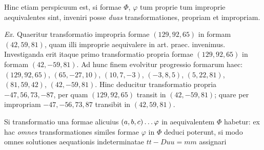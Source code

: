 Hinc etiam perspicuum est, si formae $\Phi$, $\varphi$ tum proprie tum improprie aequivalentes sint, inveniri posse \textit{duas} transformationes, propriam et impropriam.

\textit{Ex.} Quaeritur transformatio impropria formae $(129,92,65)$ in formam $(42,59,81)$, quam illi improprie aequivalere in art. praec. invenimus. Investiganda erit itaque primo transformatio propria formae $(129,92,65)$ in formam $(42,-59,81)$. Ad hunc finem evolvitur progressio formarum haec: $(129,92,65)$, $(65,-27,10)$, $(10,7,-3)$, $(-3,8,5)$, $(5,22,81)$, $(81,59,42)$, $(42,-59,81)$. Hinc deducitur transformatio propria $-47,56,73,-87$, per quam $(129,92,65)$ transit in $(42,-59,81)$; quare per impropriam $-47,\allowbreak-56,\allowbreak73,\allowbreak87$ transibit in $(42,59,81)$.

Si transformatio una formae alicuius $(a,b,c)\mathinner{\ldotp\ldotp\ldotp}\varphi$ in aequivalentem $\Phi$ habetur: ex hac \textit{omnes} transformationes similes formae $\varphi$ in $\Phi$ deduci poterunt, si modo omnes solutiones aequationis indeterminatae $tt-Duu=mm$ assignari

